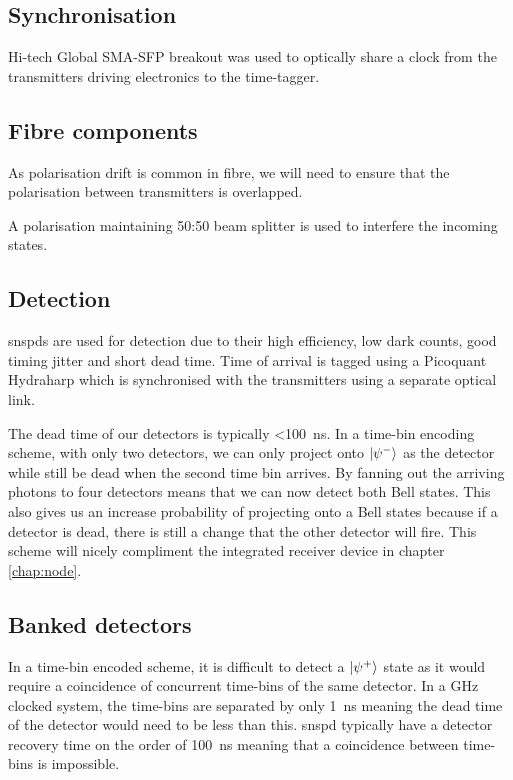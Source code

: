 \subsection{Synchronisation}

Hi-tech Global SMA-SFP breakout was used to optically share a clock from the transmitters driving electronics to the time-tagger. 

\subsection{Fibre components}

As polarisation drift is common in fibre, we will need to ensure that the polarisation between transmitters is overlapped. 

A polarisation maintaining 50:50 beam splitter is used to interfere the incoming states.

\subsection{Detection}

\Acsp{snspd} are used for detection due to their high efficiency, low dark counts, good timing jitter and short dead time. Time of arrival is tagged using a Picoquant Hydraharp which is synchronised with the transmitters using a separate optical link.

The dead time of our detectors is typically \SI{<100}{ns}. In a time-bin encoding scheme, with only two detectors, we can only project onto $\ket{\psi^{-}}$ as the detector while still be dead when the second time bin arrives. By fanning out the arriving photons to four detectors means that we can now detect both Bell states. This also gives us an increase probability of projecting onto a Bell states because if a detector is dead, there is still a change that the other detector will fire. This scheme will nicely compliment the integrated receiver device in chapter \ref{chap:node}.

\subsection{Banked detectors}

In a time-bin encoded scheme, it is difficult to detect a $\ket{\psi^+}$ state as it would require a coincidence of concurrent time-bins of the same detector. In a GHz clocked system, the time-bins are separated by only \SI{1}{\ns} meaning the dead time of the detector would need to be less than this. \ac{snspd} typically have a detector recovery time on the order of \SI{100}{\ns} meaning that a coincidence between time-bins is impossible. 

